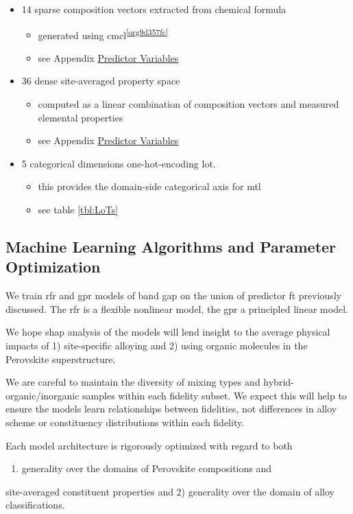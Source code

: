 \documentclass[aip, jmp, amsmath, amssymb]{revtex4-2}
\begin{document}
\begin{itemize}
\item 14 sparse composition vectors extracted from chemical formula
\begin{itemize}
\item generated using cmcl\textsuperscript{\ref{org9d357fc}}
\item see Appendix \hyperref[sec:orga229708]{Predictor Variables}
\end{itemize}
\item 36 dense site-averaged property space
\begin{itemize}
\item computed as a linear combination of composition vectors and
measured elemental properties\cite{mentel-2014}
\item see Appendix \hyperref[sec:orga229708]{Predictor Variables}
\end{itemize}
\item 5 categorical dimensions one-hot-encoding \gls{lot}.
\begin{itemize}
\item this provides the domain-side categorical axis for \gls{mtl}
\item see table \ref{tbl:LoTs}
\end{itemize}
\end{itemize}

\subsection*{Machine Learning Algorithms and Parameter Optimization}
\label{sec:orgf05bcb1}
We train \acrshort{rfr} and \acrshort{gpr} models of band gap on the union of predictor
\gls{ft} previously discussed. The \acrshort{rfr} is a flexible nonlinear model,
the \acrshort{gpr} a principled linear model.

We hope \Acrfull{shap} analysis of the models
will lend insight to the average physical impacts of 1) site-specific
alloying and 2) using organic molecules in the Perovskite
superstructure.

We are careful to maintain the diversity of mixing types and
hybrid-organic/inorganic samples within each fidelity subset. We
expect this will help to ensure the models learn relationships between
fidelities, not differences in alloy scheme or constituency
distributions within each fidelity.

Each model architecture is rigorously optimized with regard to both
\begin{enumerate}
\item generality over the domains of Perovskite compositions and
\end{enumerate}
site-averaged constituent properties and 2) generality over the domain
of alloy classifications.
\end{document}
